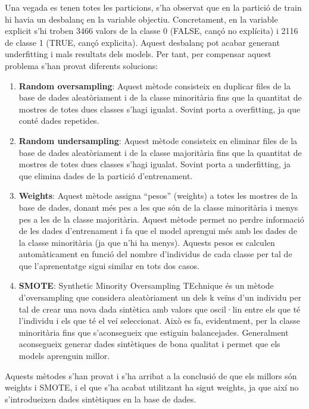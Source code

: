 Una vegada es tenen totes les particions, s'ha observat que en la partició de train hi havia un desbalanç en la variable objectiu. Concretament, en la variable explicit s'hi troben 3466 valors de la classe 0 (FALSE, cançó no explícita) i 2116 de classe 1 (TRUE, cançó explicita). Aquest desbalanç pot acabar generant underfitting i mals resultats dels models. Per tant, per compensar aquest problema s'han provat diferents solucions:
\begin{enumerate}
    \item \textbf{Random oversampling}: Aquest mètode consisteix en duplicar files de la base de dades aleatòriament i de la classe minoritària fins que la quantitat de mostres de totes dues classes s'hagi igualat. Sovint porta a overfitting, ja que conté dades repetides.

    \item \textbf{Random undersampling}: Aquest mètode consisteix en eliminar files de la base de dades aleatòriament i de la classe majoritària fins que la quantitat de mostres de totes dues classes s'hagi igualat. Sovint porta a underfitting, ja que elimina dades de la partició d'entrenament.

    \item \textbf{Weights}: Aquest mètode assigna ``pesos'' (weights) a totes les mostres de la base de dades, donant més pes a les que són de la classe minoritària i menys pes a les de la classe majoritària. Aquest mètode permet no perdre informació de les dades d'entrenament i fa que el model aprengui més amb les dades de la classe minoritària (ja que n'hi ha menys). Aquests pesos es calculen automàticament en funció del nombre d'individus de cada classe per tal de que l'aprenentatge sigui similar en tots dos casos.

    \item \textbf{SMOTE}: Synthetic Minority Oversampling TEchnique és un mètode d'oversampling que considera aleatòriament un dels k veïns d'un individu per tal de crear una nova dada sintètica amb valors que oscil·lin entre els que té l'individu i els que té el veí seleccionat. Això es fa, evidentment, per la classe minoritària fins que s'aconsegueix que estiguin balancejades. Generalment aconsegueix generar dades sintètiques de bona qualitat i permet que els models aprenguin millor.
\end{enumerate}

Aquests mètodes s'han provat i s'ha arribat a la conclusió de que els millors són weights i SMOTE, i el que s'ha acabat utilitzant ha sigut weights, ja que així no s'introdueixen dades sintètiques en la base de dades.

